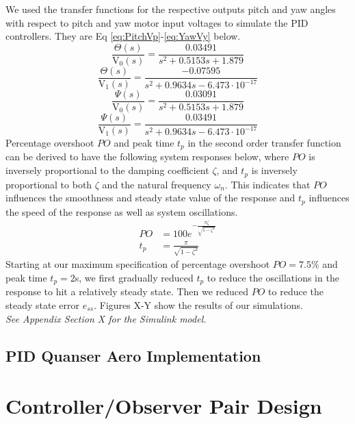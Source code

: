 \documentclass[11pt]{article}
\begin{document}
We used the transfer functions for the respective outputs pitch and yaw angles with respect to pitch and yaw motor input voltages to simulate the PID controllers. They are Eq \ref{eq:PitchVp}-\ref{eq:YawVy} below.
\begin{equation}\label{eq:PitchVp}
    \frac{\Theta (s)}{\text{V}_0 (s)} = \frac{0.03491}{s^2 + 0.5153 s + 1.879}
\end{equation}
\begin{equation}\label{eq:PitchVy}
    \frac{\Theta (s)}{\text{V}_1 (s)} = \frac{-0.07595}{s^2 + 0.9634 s - 6.473\cdot 10^{-17}}
\end{equation}
\begin{equation}\label{eq:YawVp}
    \frac{\Psi (s)}{\text{V}_0 (s)} = \frac{0.03091}{s^2 + 0.5153 s + 1.879}
\end{equation}
\begin{equation}\label{eq:YawVy}
    \frac{\Psi (s)}{\text{V}_1 (s)} = \frac{0.03491}{s^2 + 0.9634 s - 6.473\cdot 10^{-17}}
\end{equation}
Percentage overshoot $PO$ and peak time $t_p$ in the second order transfer function can be derived to have the following system responses below, where $PO$ is inversely proportional to the damping coefficient $\zeta$, and $t_p$ is inversely proportional to both $\zeta$ and the natural frequency $\omega_n$. This indicates that $PO$ influences the smoothness and steady state value of the response and $t_p$ influences the speed of the response as well as system oscillations.
\begin{align*}
    PO &= 100 e^{-\frac{\pi \zeta}{\sqrt{1 - \zeta^2}}}\\
    t_p &= \frac{\pi}{\sqrt{1 - \zeta^2}}
\end{align*}
Starting at our maximum specification of percentage overshoot $PO = 7.5$\% and peak time $t_p = 2$s, we first gradually reduced $t_p$ to reduce the oscillations in the response to hit a relatively steady state. Then we reduced $PO$ to reduce the steady state error $e_{ss}$. Figures X-Y show the results of our simulations.\\ \textit{See Appendix Section X for the Simulink model.}

\subsection{PID Quanser Aero Implementation}

\newpage
\section{Controller/Observer Pair Design}
\end{document}
